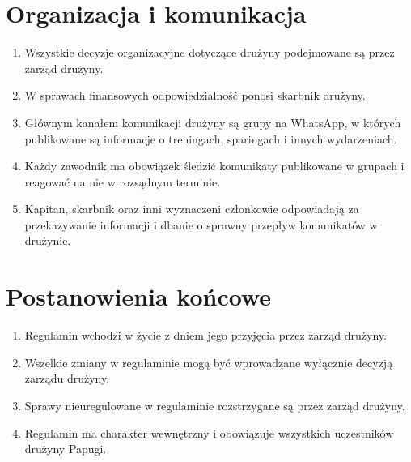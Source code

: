 \documentclass[12pt,a4paper]{article}
\let\stdsection\section
\renewcommand\section{\clearpage\stdsection}
\begin{document}
\section{Organizacja i komunikacja}
\begin{enumerate}
  \item Wszystkie decyzje organizacyjne dotyczące drużyny podejmowane są przez zarząd drużyny.
  \item W sprawach finansowych odpowiedzialność ponosi skarbnik drużyny.
  \item Głównym kanałem komunikacji drużyny są grupy na WhatsApp, w których publikowane są informacje o treningach, sparingach i innych wydarzeniach.
  \item Każdy zawodnik ma obowiązek śledzić komunikaty publikowane w grupach i reagować na nie w rozsądnym terminie.
  \item Kapitan, skarbnik oraz inni wyznaczeni członkowie odpowiadają za przekazywanie informacji i dbanie o sprawny przepływ komunikatów w drużynie.
\end{enumerate}

\section{Postanowienia końcowe}
\begin{enumerate}
  \item Regulamin wchodzi w życie z dniem jego przyjęcia przez zarząd drużyny.
  \item Wszelkie zmiany w regulaminie mogą być wprowadzane wyłącznie decyzją zarządu drużyny.
  \item Sprawy nieuregulowane w regulaminie rozstrzygane są przez zarząd drużyny.
  \item Regulamin ma charakter wewnętrzny i obowiązuje wszystkich uczestników drużyny Papugi.
\end{enumerate}
\end{document}
